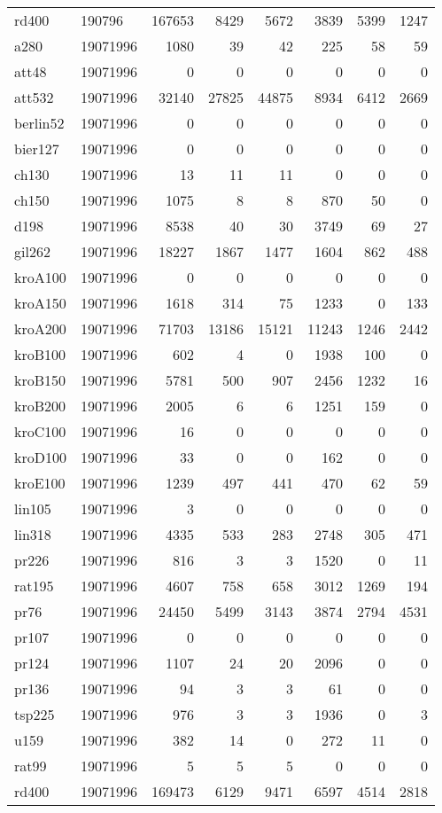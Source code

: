 \begin{center}
\begin{longtable}{llrrrrrr}
rd400  & 190796 & 167653 & 8429 & 5672 & 3839 & 5399 & 1247\\
a280  & 19071996 & 1080 & 39 & 42 & 225 & 58 & 59\\
att48  & 19071996 & 0 & 0 & 0 & 0 & 0 & 0\\
att532  & 19071996 & 32140 & 27825 & 44875 & 8934 & 6412 & 2669\\
berlin52  & 19071996 & 0 & 0 & 0 & 0 & 0 & 0\\
bier127  & 19071996 & 0 & 0 & 0 & 0 & 0 & 0\\
ch130  & 19071996 & 13 & 11 & 11 & 0 & 0 & 0\\
ch150  & 19071996 & 1075 & 8 & 8 & 870 & 50 & 0\\
d198  & 19071996 & 8538 & 40 & 30 & 3749 & 69 & 27\\
gil262  & 19071996 & 18227 & 1867 & 1477 & 1604 & 862 & 488\\
kroA100  & 19071996 & 0 & 0 & 0 & 0 & 0 & 0\\
kroA150  & 19071996 & 1618 & 314 & 75 & 1233 & 0 & 133\\
kroA200  & 19071996 & 71703 & 13186 & 15121 & 11243 & 1246 & 2442\\
kroB100  & 19071996 & 602 & 4 & 0 & 1938 & 100 & 0\\
kroB150  & 19071996 & 5781 & 500 & 907 & 2456 & 1232 & 16\\
kroB200  & 19071996 & 2005 & 6 & 6 & 1251 & 159 & 0\\
kroC100  & 19071996 & 16 & 0 & 0 & 0 & 0 & 0\\
kroD100  & 19071996 & 33 & 0 & 0 & 162 & 0 & 0\\
kroE100  & 19071996 & 1239 & 497 & 441 & 470 & 62 & 59\\
lin105  & 19071996 & 3 & 0 & 0 & 0 & 0 & 0\\
lin318  & 19071996 & 4335 & 533 & 283 & 2748 & 305 & 471\\
pr226  & 19071996 & 816 & 3 & 3 & 1520 & 0 & 11\\
rat195  & 19071996 & 4607 & 758 & 658 & 3012 & 1269 & 194\\
pr76  & 19071996 & 24450 & 5499 & 3143 & 3874 & 2794 & 4531\\
pr107  & 19071996 & 0 & 0 & 0 & 0 & 0 & 0\\
pr124  & 19071996 & 1107 & 24 & 20 & 2096 & 0 & 0\\
pr136  & 19071996 & 94 & 3 & 3 & 61 & 0 & 0\\
tsp225  & 19071996 & 976 & 3 & 3 & 1936 & 0 & 3\\
u159  & 19071996 & 382 & 14 & 0 & 272 & 11 & 0\\
rat99  & 19071996 & 5 & 5 & 5 & 0 & 0 & 0\\
rd400  & 19071996 & 169473 & 6129 & 9471 & 6597 & 4514 & 2818\\


\end{longtable}
\end{center}


